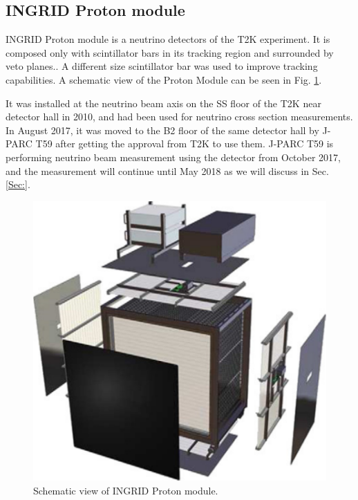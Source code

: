 \subsection{INGRID Proton module}
INGRID Proton module is a neutrino detectors of the T2K experiment.
It is composed only with scintillator bars in its tracking region and surrounded by veto planes.. 
A different size scintillator bar was used to improve tracking capabilities. 
A schematic view of the Proton Module can be seen in Fig. \ref{fig:proton_module}. 


It was installed at the neutrino beam axis on the SS floor of the T2K near detector hall in 2010, and had been used for neutrino cross section measurements.
In August 2017, it was moved to the B2 floor of the same detector hall by J-PARC T59 after getting the approval from T2K to use them.
J-PARC T59 is performing neutrino beam measurement using the detector from October 2017, and the measurement  will continue until May 2018 as we will discuss in Sec. \ref{Sec:}.

\begin{figure}[tbh]
\begin{center}
\includegraphics[width=0.6\linewidth]{fig/proton_module.pdf}
\end{center}
\caption{
Schematic view of INGRID Proton module.
}
\label{fig:proton_module}
\end{figure}
